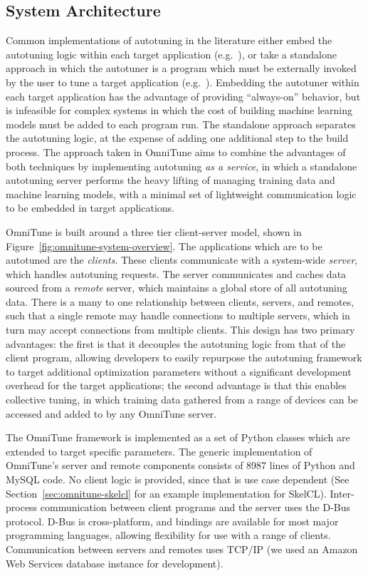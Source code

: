 \subsection{System Architecture}

Common implementations of autotuning in the literature either embed
the autotuning logic within each target application
(e.g.~\cite{Chen2014}), or take a standalone approach in which the
autotuner is a program which must be externally invoked by the user to
tune a target application (e.g.~\cite{Lutz2013}). Embedding the
autotuner within each target application has the advantage of
providing ``always-on'' behavior, but is infeasible for complex
systems in which the cost of building machine learning models must be
added to each program run. The standalone approach separates the
autotuning logic, at the expense of adding one additional step to the
build process. The approach taken in OmniTune aims to combine the
advantages of both techniques by implementing autotuning \emph{as a
  service}, in which a standalone autotuning server performs the heavy
lifting of managing training data and machine learning models, with a
minimal set of lightweight communication logic to be embedded in
target applications.

OmniTune is built around a three tier client-server model, shown in
Figure~\ref{fig:omnitune-system-overview}. The applications which are
to be autotuned are the \emph{clients}. These clients communicate with
a system-wide \emph{server}, which handles autotuning requests. The
server communicates and caches data sourced from a \emph{remote}
server, which maintains a global store of all autotuning data. There
is a many to one relationship between clients, servers, and remotes,
such that a single remote may handle connections to multiple servers,
which in turn may accept connections from multiple clients. This
design has two primary advantages: the first is that it decouples the
autotuning logic from that of the client program, allowing developers
to easily repurpose the autotuning framework to target additional
optimization parameters without a significant development overhead for
the target applications; the second advantage is that this enables
collective tuning, in which training data gathered from a range of
devices can be accessed and added to by any OmniTune server.

The OmniTune framework is implemented as a set of Python classes which
are extended to target specific parameters. The generic implementation
of OmniTune's server and remote components consists of 8987 lines of
Python and MySQL code. No client logic is provided, since that is use
case dependent (See Section~\ref{sec:omnitune-skelcl} for an example
implementation for SkelCL). Inter-process communication between client
programs and the server uses the D-Bus protocol. D-Bus is
cross-platform, and bindings are available for most major programming
languages, allowing flexibility for use with a range of
clients. Communication between servers and remotes uses TCP/IP (we
used an Amazon Web Services database instance for development).


